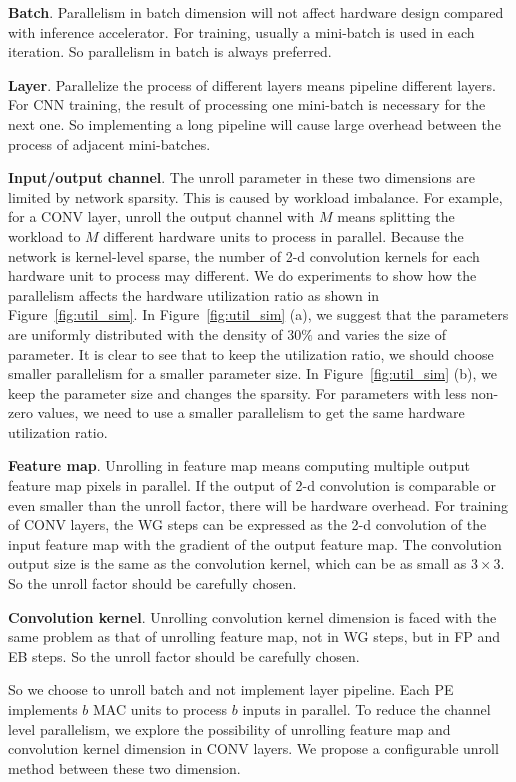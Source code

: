 {\bf{Batch}}. Parallelism in batch dimension will not affect hardware design compared with inference accelerator. For training, usually a mini-batch is used in each iteration. So parallelism in batch is always preferred.

{\bf{Layer}}. Parallelize the process of different layers means pipeline different layers. For CNN training, the result of processing one mini-batch is necessary for the next one. So implementing a long pipeline will cause large overhead between the process of adjacent mini-batches.

{\bf{Input/output channel}}. The unroll parameter in these two dimensions are limited by network sparsity. This is caused by workload imbalance. For example, for a CONV layer, unroll the output channel with $M$ means splitting the workload to $M$ different hardware units to process in parallel. Because the network is kernel-level sparse, the number of 2-d convolution kernels for each hardware unit to process may different. We do experiments to show how the parallelism affects the hardware utilization ratio as shown in Figure~\ref{fig:util_sim}. In Figure~\ref{fig:util_sim} (a), we suggest that the parameters are uniformly distributed with the density of $30\%$ and varies the size of parameter. It is clear to see that to keep the utilization ratio, we should choose smaller parallelism for a smaller parameter size. In Figure~\ref{fig:util_sim} (b), we keep the parameter size and changes the sparsity. For parameters with less non-zero values, we need to use a smaller parallelism to get the same hardware utilization ratio. 

{\bf{Feature map}}. Unrolling in feature map means computing multiple output feature map pixels in parallel. If the output of 2-d convolution is comparable or even smaller than the unroll factor, there will be hardware overhead. For training of CONV layers, the WG steps can be expressed as the 2-d convolution of the input feature map with the gradient of the output feature map. The convolution output size is the same as the convolution kernel, which can be as small as $3\times 3$. So the unroll factor should be carefully chosen.

{\bf{Convolution kernel}}. Unrolling convolution kernel dimension is faced with the same problem as that of unrolling feature map, not in WG steps, but in FP and EB steps. So the unroll factor should be carefully chosen.



So we choose to unroll batch and not implement layer pipeline. Each PE implements $b$ MAC units to process $b$ inputs in parallel. To reduce the channel level parallelism, we explore the possibility of unrolling feature map and convolution kernel dimension in CONV layers. We propose a configurable unroll method between these two dimension. 


